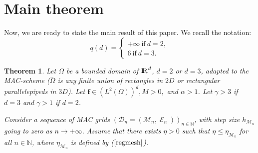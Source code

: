 \documentclass{amsart}
\newtheorem{thm}{Theorem}
\numberwithin{equation}{section}
\begin{document}
\section{Main theorem}

Now, we are ready to state the main result of this paper.
We recall the notation: 
\begin{equation*} q(d)= \left\{
\begin{array}{l}
  +\infty \ \text{if} \ d=2, \\
 6 \ \text{if} \ d=3.
\end{array}
\right.
\end{equation*}

\begin{thm}\label{mainthm}
Let $\Omega$ be a bounded domain of ${\ifmmode{\rm	I\mkern-3.1mu
R\mkern1mu}\else{\rm I\kern-.18em 
R\hskip1pt\	}\fi\relax}^d$, $d=2$ or $d=3$, adapted to the MAC-scheme  ($\bar \Omega$ is any finite union of rectangles in $2D$ or rectangular parallelepipeds in $3D$). Let $\bm{f} \in (L^2(\Omega))^d, M>0,$ and $ \alpha > 1$. Let $\gamma > 3 $ if $d=3$ and $ \gamma > 1 $ if $d=2$. 

Consider a sequence of MAC grids $({{\mathcal D}}_n=({{\mathcal M}}_n,\operatorname{{\mathcal{E}}}_n))_{n\in {\mathbb{N}}}$, with step size $h_{{{\mathcal M}}_n}$ going to zero as ${{n {\rightarrow} + \infty}}$. Assume that there exists $\eta > 0 $ such that  $ \eta \le \eta_{{{\mathcal M}}_n} $ for all $ n \in \mathbb{N} $, where $ \eta_{{{\mathcal M}}_n} $ is defined by ($\ref{regmesh}$).


\end{thm}
\end{document}
